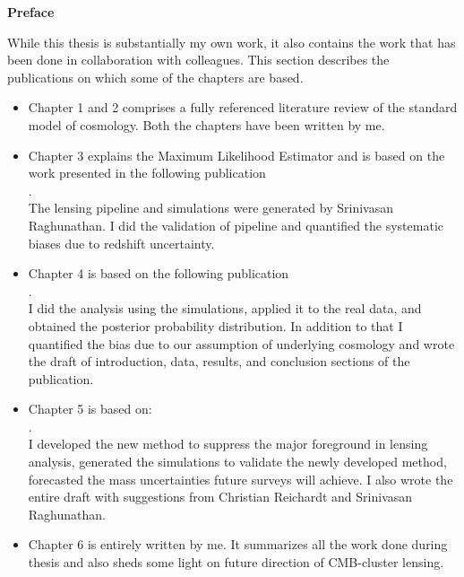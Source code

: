 \bfseries{Preface}\mdseries\\                                                                                                
\vspace{0.5cm}                                                                                                                                  
                                                                                            
While this thesis is substantially my own work, it also contains the work that has been done in collaboration with colleagues. 
This section describes the publications on which some of the chapters are based.

\begin{itemize}
\item Chapter 1 and 2 comprises a fully referenced literature review of the standard model of cosmology. Both the chapters have been written by me.
\item Chapter 3 explains the Maximum Likelihood Estimator and is based on the work presented in the following publication\\ 
\citet*{raghunathan17a}. \\The lensing pipeline and simulations were generated by Srinivasan Raghunathan. I did the validation of pipeline and quantified the systematic biases due to redshift uncertainty.
\item Chapter 4 is based on the following publication\\ \citet*{raghunathan18}. \\I did the analysis using the simulations, applied it to the real data, and obtained the posterior probability distribution. In addition to that I quantified the bias due to our assumption of underlying cosmology and wrote the draft of introduction, data, results, and conclusion sections of the publication. 
\item Chapter 5 is based on:\\ \citet*{patil19}.
\\ I developed the new method to suppress the major foreground in lensing analysis, generated the simulations to validate the newly developed method, forecasted the mass uncertainties future surveys will achieve. I also wrote the entire draft with suggestions from Christian Reichardt and Srinivasan Raghunathan.
\item Chapter 6 is entirely written by me. It summarizes all the work done during thesis and also sheds some light on future direction of CMB-cluster lensing.
\end{itemize}

